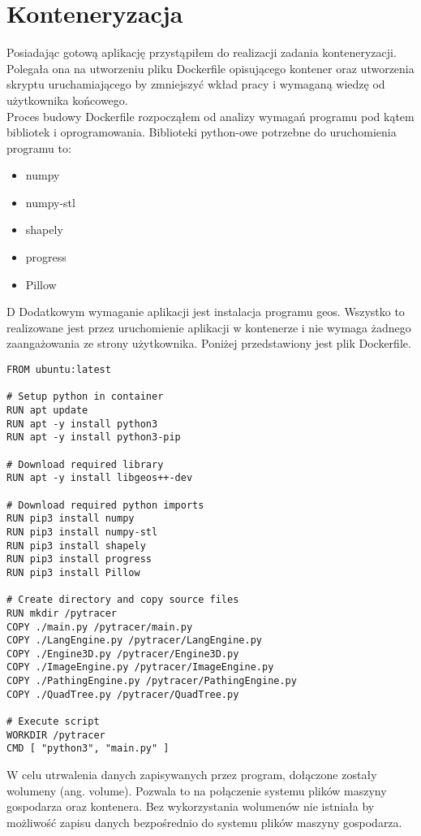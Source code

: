 \documentclass[a4paper,12pt,twoside,openany]{report}
\begin{document}
  \section{Konteneryzacja}
    Posiadając gotową aplikację przystąpiłem do realizacji zadania konteneryzacji. Polegała ona na utworzeniu pliku Dockerfile opisującego kontener oraz 
    utworzenia skryptu uruchamiającego by zmniejszyć wkład pracy i wymaganą wiedzę od użytkownika końcowego.\\
    Proces budowy Dockerfile rozpocząłem od analizy wymagań programu pod kątem bibliotek i oprogramowania. Biblioteki python-owe potrzebne do uruchomienia 
    programu to:
    \begin{itemize}
      \item numpy
      \item numpy-stl
      \item shapely
      \item progress
      \item Pillow
    \end{itemize}D
    Dodatkowym wymaganie aplikacji jest instalacja programu geos. Wszystko to realizowane jest przez uruchomienie aplikacji w kontenerze i nie wymaga żadnego 
    zaangażowania ze strony użytkownika. Poniżej przedstawiony jest plik Dockerfile.
    \begin{lstlisting}
FROM ubuntu:latest

# Setup python in container
RUN apt update
RUN apt -y install python3
RUN apt -y install python3-pip

# Download required library
RUN apt -y install libgeos++-dev

# Download required python imports
RUN pip3 install numpy
RUN pip3 install numpy-stl
RUN pip3 install shapely
RUN pip3 install progress
RUN pip3 install Pillow

# Create directory and copy source files
RUN mkdir /pytracer
COPY ./main.py /pytracer/main.py
COPY ./LangEngine.py /pytracer/LangEngine.py
COPY ./Engine3D.py /pytracer/Engine3D.py
COPY ./ImageEngine.py /pytracer/ImageEngine.py
COPY ./PathingEngine.py /pytracer/PathingEngine.py
COPY ./QuadTree.py /pytracer/QuadTree.py

# Execute script
WORKDIR /pytracer
CMD [ "python3", "main.py" ]
    \end{lstlisting}
    W celu utrwalenia danych zapisywanych przez program, dołączone zostały wolumeny (ang. volume). Pozwala to na połączenie systemu plików maszyny gospodarza 
    oraz kontenera. Bez wykorzystania wolumenów nie istniała by możliwość zapisu danych bezpośrednio do systemu plików maszyny gospodarza.
\end{document}
